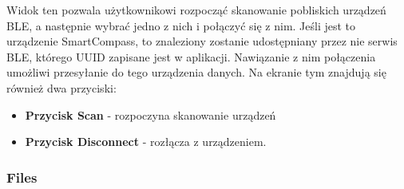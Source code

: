 Widok ten pozwala użytkownikowi rozpocząć skanowanie pobliskich urządzeń BLE, a następnie wybrać jedno z nich i połączyć się z nim. Jeśli jest to urządzenie SmartCompass, to znaleziony zostanie udostępniany przez nie serwis BLE, którego UUID zapisane jest w aplikacji. Nawiązanie z nim połączenia umożliwi przesyłanie do tego urządzenia danych.
Na ekranie tym znajdują się również dwa przyciski:
\begin{itemize}
    \item \textbf{Przycisk Scan} - rozpoczyna skanowanie urządzeń
    \item \textbf{Przycisk Disconnect} - rozłącza z urządzeniem.
\end{itemize}

\subsubsection{Files}
